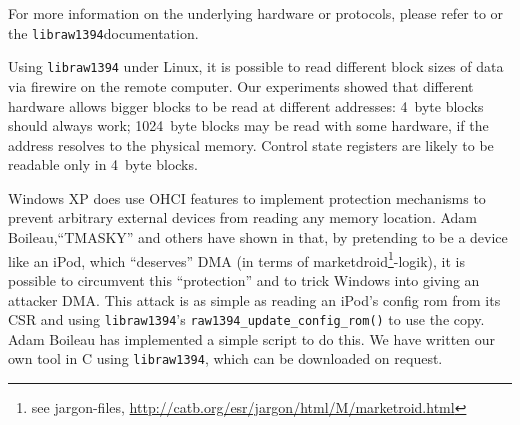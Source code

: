 
For more information on the underlying hardware or protocols, please refer to
\cite{OHCIspecs:2000,fwire_sys_arch:2222} or the
\texttt{libraw1394}\footnotemark[\value{footnote}] documentation.





Using \texttt{libraw1394} under Linux, it is possible to read different block
sizes of data via firewire on the remote computer. Our experiments showed that
different hardware allows bigger blocks to be read at different addresses:
4~byte blocks should always work; 1024~byte blocks may be read with some
hardware, if the address resolves to the physical memory. Control state
registers are likely to be readable only in 4~byte blocks.


\label{windows-dma} Windows XP does use OHCI features to implement protection
mechanisms to prevent arbitrary external devices from reading any memory
location.  Adam Boileau,``TMASKY'' and others have shown in
\cite{rux2k6firewire:2006} that, by pretending to be a device like an iPod,
which ``deserves'' DMA (in terms of marketdroid\footnote{see jargon-files,
\href{http://catb.org/esr/jargon/html/M/marketroid.html}
{http://catb.org/esr/jargon/html/M/marketroid.html}}-logik), it is possible to
circumvent this ``protection'' and to trick Windows into giving an attacker DMA.
This attack is as simple as reading an iPod's config rom from its CSR and using
\texttt{libraw1394}'s \texttt{raw1394\_update\_config\_rom()} to use the copy.
Adam Boileau has implemented a simple script to do this. We have written our own
tool in C using \texttt{libraw1394}, which can be downloaded on request.



